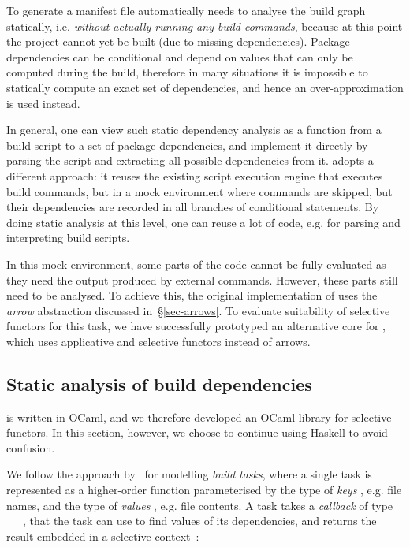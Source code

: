 

To generate a manifest file automatically \Dune needs to analyse the build graph
statically, i.e. \emph{without actually running any build commands}, because at
this point the project cannot yet be built (due to missing dependencies).
Package dependencies can be conditional and depend on values that can only be
computed during the build, therefore in many situations it is impossible to
statically compute an exact set of dependencies, and hence an over-approximation
is used instead.

In general, one can view such static dependency analysis as a function from a
build script to a set of package dependencies, and implement it directly by
parsing the script and extracting all possible dependencies from it. \Dune
adopts a different approach: it reuses the existing script execution engine that
executes build commands, but in a mock environment where commands are skipped,
but their dependencies are recorded in all branches of conditional statements.
By doing static analysis at this level, one can reuse a lot of code, e.g. for
parsing and interpreting build scripts.

In this mock environment, some parts of the code cannot be fully evaluated as
they need the output produced by external commands. However, these parts still
need to be analysed. To achieve this, the original implementation of \Dune uses
the \emph{arrow} abstraction discussed in~\S\ref{sec-arrows}. To evaluate
suitability of selective functors for this task, we have successfully prototyped
an alternative core for \Dune, which uses applicative and selective functors
instead of arrows.

\subsection{Static analysis of build dependencies}\label{sec-static-example}

\Dune is written in OCaml, and we therefore developed an OCaml library for
selective functors. In this section, however, we choose to continue using
Haskell to avoid confusion.

We follow the approach by~\citet{mokhov2018build} for modelling \emph{build
tasks}, where a single task is represented as a higher-order function
parameterised by the type of \emph{keys} , e.g. file names, and the type
of \emph{values} , e.g. file contents. A task takes a \emph{callback} of
type ~\hs{->}~~, that the task can use to find values of its
dependencies, and returns the result embedded in a selective context~:

